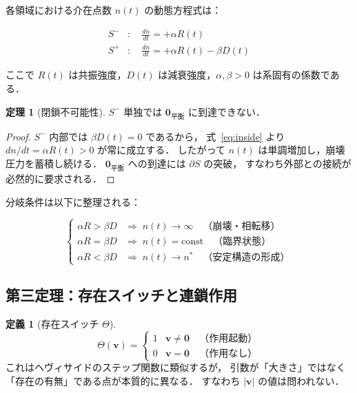 \documentclass[12pt, a4paper]{article}
\theoremstyle{definition}
\newtheorem{definition}{定義}
\newtheorem{theorem}{定理}
\newcommand{\vzero}{\mathbf{0}}
\newcommand{\vequil}{\mathbf{0}_{\text{平衡}}}
\newcommand{\Switch}{\Theta}
\begin{document}
各領域における介在点数 $n(t)$ の動態方程式は：

\begin{align}
  S^-&: \quad \frac{dn}{dt} = +\alpha R(t)
  \label{eq:inside} \\[4pt]
  S^+&: \quad \frac{dn}{dt} = +\alpha R(t) - \beta D(t)
  \label{eq:outside}
\end{align}

ここで $R(t)$ は共振強度，$D(t)$ は減衰強度，$\alpha, \beta > 0$ は系固有の係数である．

\begin{theorem}[閉鎖不可能性]
  $S^-$ 単独では $\vequil$ に到達できない．
\end{theorem}

\begin{proof}
  $S^-$ 内部では $\beta D(t) = 0$ であるから，
  式~\eqref{eq:inside} より $dn/dt = \alpha R(t) > 0$ が常に成立する．
  したがって $n(t)$ は単調増加し，崩壊圧力を蓄積し続ける．
  $\vequil$ への到達には $\partial S$ の突破，
  すなわち外部との接続が必然的に要求される．
\end{proof}

分岐条件は以下に整理される：

\begin{equation}
  \begin{cases}
    \alpha R > \beta D & \Rightarrow\; n(t) \to \infty
      \quad \text{（崩壊・相転移）} \\[4pt]
    \alpha R = \beta D & \Rightarrow\; n(t) = \text{const}
      \quad \text{（臨界状態）} \\[4pt]
    \alpha R < \beta D & \Rightarrow\; n(t) \to n^*
      \quad \text{（安定構造の形成）}
  \end{cases}
  \label{eq:bifurcation}
\end{equation}

\subsection{第三定理：存在スイッチと連鎖作用}

\begin{definition}[存在スイッチ $\Switch$]
  \begin{equation}
    \Switch(\mathbf{v}) =
    \begin{cases}
      1 & \mathbf{v} \neq \vzero \quad \text{（作用起動）} \\
      0 & \mathbf{v} = \vzero \quad \text{（作用なし）}
    \end{cases}
    \label{eq:switch}
  \end{equation}
  これはヘヴィサイドのステップ関数に類似するが，
  引数が「大きさ」ではなく「存在の有無」である点が本質的に異なる．
  すなわち $|\mathbf{v}|$ の値は問われない．
\end{definition}
\end{document}
